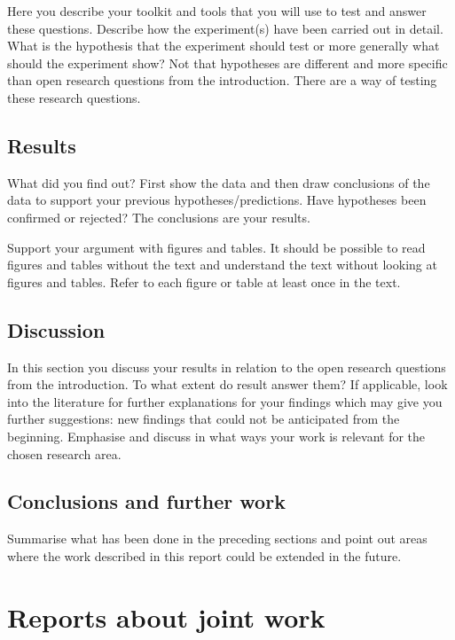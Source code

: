 \documentclass[a4paper,11pt]{article}
\begin{document}
Here you describe your toolkit and tools that you will use to test and
answer these questions. Describe how the experiment(s) have been carried
out in detail. What is the hypothesis that the experiment should test or
more generally what should the experiment show? Not that hypotheses are
different and more specific than open research questions from the
introduction. There are a way of testing these research questions.

\subsection{Results}\label{results}

What did you find out? First show the data and then draw conclusions of
the data to support your previous hypotheses/predictions. Have
hypotheses been confirmed or rejected? The conclusions are your results.

Support your argument with figures and tables. It should be possible to
read figures and tables without the text and understand the text without
looking at figures and tables. Refer to each figure or table at least
once in the text.

\subsection{Discussion}\label{discussion}

In this section you discuss your results in relation to the open
research questions from the introduction. To what extent do result
answer them? If applicable, look into the literature for further
explanations for your findings which may give you further suggestions:
new findings that could not be anticipated from the beginning. Emphasise
and discuss in what ways your work is relevant for the chosen research
area.

\subsection{Conclusions and further
work}\label{conclusions-and-further-work}

Summarise what has been done in the preceding sections and point out
areas where the work described in this report could be extended in the
future.


\section{Reports about joint work}
\end{document}
